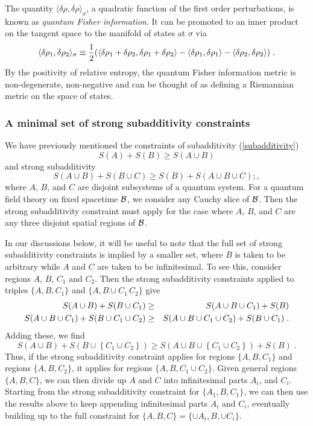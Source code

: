 \documentclass[12pt,epsf]{article}
\newcommand{\be}{\begin{equation}}
\newcommand{\ee}{\end{equation}}
\newcommand{\beas}{\begin{eqnarray*}}
\newcommand{\eeas}{\end{eqnarray*}}
\begin{document}
The quantity $\langle \delta \rho, \delta \rho \rangle_\sigma$, a quadratic function of the first order perturbations, is known as {\it quantum Fisher information}. It can be promoted to an inner product on the tangent space to the manifold of states at $\sigma$ via
\be
\label{Fishermetric}
\langle \delta \rho_1, \delta \rho_2 \rangle_{\sigma} \equiv {1 \over 2} (\langle \delta \rho_1 + \delta \rho_2, \delta \rho_1 + \delta \rho_2 \rangle - \langle \delta \rho_1 , \delta \rho_1 \rangle - \langle \delta \rho_2, \delta \rho_2 \rangle) \; .
\ee
By the positivity of relative entropy, the quantum Fisher information metric is non-degenerate, non-negative and can be thought of as defining a Riemannian metric on the space of states.

\subsubsection*{A minimal set of strong subadditivity constraints}

We have previously mentioned the constraints of subadditivity (\ref{subadditivity})
\be
\label{SA2}
S(A) + S(B) \ge S(A \cup B)
\ee
and strong subadditivity
\be
\label{SSA2}
S(A \cup B) + S(B \cup C) \ge S(B) + S(A \cup B \cup C) ; ,
\ee
where $A$, $B$, and $C$ are disjoint subsystems of a quantum system. For a quantum field theory on fixed spacetime ${\cal B}$, we consider any Cauchy slice of ${\cal B}$. Then the strong subadditivity constraint must apply for the case where $A$, $B$, and $C$ are any three disjoint spatial regions of ${\cal B}$.

In our discussions below, it will be useful to note \cite{Bhattacharya:2014vja, Lashkari:2014kda} that the full set of strong subadditivity constraints is implied by a smaller set, where $B$ is taken to be arbitrary while $A$ and $C$ are taken to be infinitesimal. To see this, consider regions $A$, $B$, $C_1$ and $C_2$. Then the strong subadditivity constraints applied to triples $\{A,B,C_1 \}$ and $\{A,B \cup C_1\, C_2 \}$ give
\beas
S(A \cup B) + S(B \cup C_1) &\ge& S(A \cup B \cup C_1) + S(B) \cr
S(A \cup B \cup C_1) + S(B \cup C_1 \cup C_2) &\ge& S(A \cup B \cup C_1 \cup C_2) + S(B \cup C_1) \; .
\eeas
Adding these, we find
\[
S(A \cup B) + S(B \cup \left\{C_1 \cup C_2 \right\}) \ge S(A \cup B \cup \left\{C_1 \cup C_2 \right\}) + S(B) \; .
\]
Thus, if the strong subadditivity constraint applies for regions $\{A,B,C_1\}$ and regions $\{A,B,C_2\}$, it applies for regions $\{A,B,C_1 \cup C_2\}$. Given general regions $\{A,B,C\}$, we can then divide up $A$ and $C$ into infinitesimal parts $A_i$, and $C_i$. Starting from the strong subadditivity constraint for $\{A_1,B,C_1\}$, we can then use the results above to keep appending infinitesimal parts $A_i$ and $C_i$, eventually building up to the full constraint for $\{A,B,C\} = \{\cup A_i,B, \cup C_i\}$.
\end{document}
